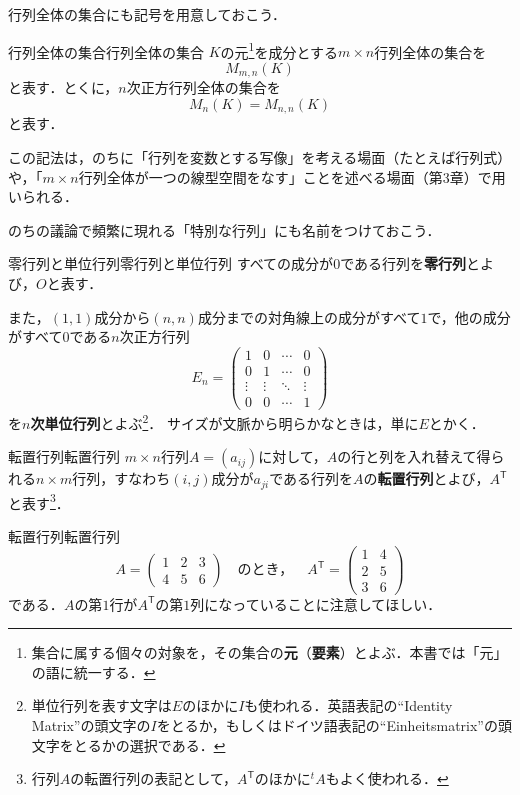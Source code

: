 行列全体の集合にも記号を用意しておこう．

\begin{definition}{行列全体の集合}{行列全体の集合}
  $K$の元\footnote{集合に属する個々の対象を，その集合の\textbf{元}（\textbf{要素}）とよぶ．本書では「元」の語に統一する．}を成分とする$m \times n$行列全体の集合を
  \[
    M_{m,n}(K)
  \]
  と表す．とくに，$n$次正方行列全体の集合を
  \[
    M_n(K) = M_{n,n}(K)
  \]
  と表す．
\end{definition}

この記法は，のちに「行列を変数とする写像」を考える場面（たとえば行列式）や，「$m \times n$行列全体が一つの線型空間をなす」ことを述べる場面（第3章）で用いられる．

のちの議論で頻繁に現れる「特別な行列」にも名前をつけておこう．

\begin{definition}{零行列と単位行列}{零行列と単位行列}
  すべての成分が$0$である行列を\textbf{零行列}とよび，$O$と表す．

  また，$(1,1)$成分から$(n,n)$成分までの対角線上の成分がすべて$1$で，他の成分がすべて$0$である$n$次正方行列
  \[
    E_n =
    \begin{pmatrix}
      1 & 0 & \cdots & 0 \\
      0 & 1 & \cdots & 0 \\
      \vdots & \vdots & \ddots & \vdots \\
      0 & 0 & \cdots & 1
    \end{pmatrix}
  \]
  を\textbf{$n$次単位行列}とよぶ\footnote{単位行列を表す文字は$E$のほかに$I$も使われる．英語表記の``Identity Matrix''の頭文字の$I$をとるか，もしくはドイツ語表記の``Einheitsmatrix''の頭文字をとるかの選択である．}．
  サイズが文脈から明らかなときは，単に$E$とかく．
\end{definition}

\begin{definition}{転置行列}{転置行列}
  $m \times n$行列$A = (a_{ij})$に対して，$A$の行と列を入れ替えて得られる$n \times m$行列，すなわち$(i, j)$成分が$a_{ji}$である行列を$A$の\textbf{転置行列}とよび，$A^\mathsf{T}$と表す\footnote{行列$A$の転置行列の表記として，$A^\mathsf{T}$のほかに${}^t A$もよく使われる．}．
\end{definition}

\begin{example}{転置行列}{転置行列}
  \[
    A = \begin{pmatrix} 1 & 2 & 3 \\ 4 & 5 & 6 \end{pmatrix}
    \quad \text{のとき，} \quad
    A^\mathsf{T} = \begin{pmatrix} 1 & 4 \\ 2 & 5 \\ 3 & 6 \end{pmatrix}
  \]
  である．$A$の第$1$行が$A^\mathsf{T}$の第$1$列になっていることに注意してほしい．
\end{example}

